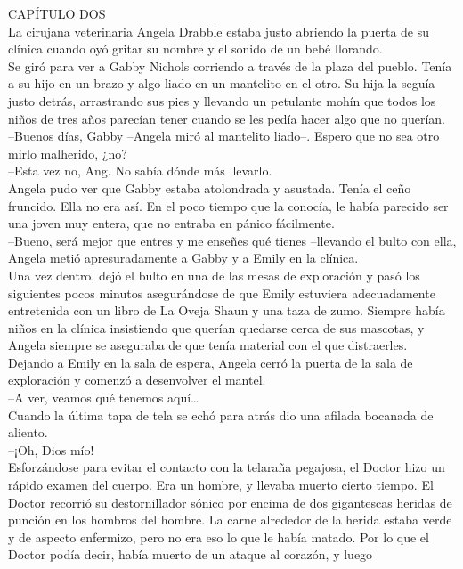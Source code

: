 {CAPÍTULO DOS\\
La cirujana veterinaria Angela Drabble estaba justo abriendo la puerta
de su clínica cuando oyó gritar su nombre y el sonido de un bebé
llorando.\\
Se giró para ver a Gabby Nichols corriendo a través de la plaza del
pueblo. Tenía a su hijo en un brazo y algo liado en un mantelito en el
otro. Su hija la seguía justo detrás, arrastrando sus pies y llevando un
petulante mohín que todos los niños de tres años parecían tener cuando
se les pedía hacer algo que no querían.\\
--Buenos días, Gabby --Angela miró al mantelito liado--. Espero que no
sea otro mirlo malherido, ¿no?\\
--Esta vez no, Ang. No sabía dónde más llevarlo.\\
Angela pudo ver que Gabby estaba atolondrada y asustada. Tenía el ceño
fruncido. Ella no era así. En el poco tiempo que la conocía, le había
parecido ser una joven muy entera, que no entraba en pánico
fácilmente.\\
--Bueno, será mejor que entres y me enseñes qué tienes --llevando el
bulto con ella, Angela metió apresuradamente a Gabby y a Emily en la
clínica.\\
Una vez dentro, dejó el bulto en una de las mesas de exploración y pasó
los siguientes pocos minutos asegurándose de que Emily estuviera
adecuadamente entretenida con un libro de La Oveja Shaun y una taza de
zumo. Siempre había niños en la clínica insistiendo que querían quedarse
cerca de sus mascotas, y Angela siempre se aseguraba de que tenía
material con el que distraerles.\\
Dejando a Emily en la sala de espera, Angela cerró la puerta de la sala
de exploración y comenzó a desenvolver el mantel.\\
--A ver, veamos qué tenemos aquí\ldots{}\\
Cuando la última tapa de tela se echó para atrás dio una afilada
bocanada de aliento.\\
--¡Oh, Dios mío!\\[2\baselineskip]Esforzándose para evitar el contacto
con la telaraña pegajosa, el Doctor hizo un rápido examen del cuerpo.
Era un hombre, y llevaba muerto cierto tiempo. El Doctor recorrió su
destornillador sónico por encima de dos gigantescas heridas de punción
en los hombros del hombre. La carne alrededor de la herida estaba verde
y de aspecto enfermizo, pero no era eso lo que le había matado. Por lo
que el Doctor podía decir, había muerto de un ataque al corazón, y luego
}
